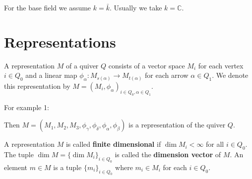 \documentclass[11pt, a4paper]{report}
\newcommand{\C}{\mathbb{C}}
\begin{document}
For the base field we assume $k=\bar{k}$. Usually we take $k=\C$.

\section{Representations}

\begin{definition}
    A representation $M$ of a quiver $Q$ consists of a vector space $M_i$ for each vertex $i \in Q_0$ and a linear map $\phi_{\alpha}: M_{s(\alpha)} \to M_{t(\alpha)}$ for each arrow $\alpha \in Q_1$. We denote this representation by $M=(M_i, \phi_{\alpha})_{i \in Q_0, \alpha \in Q_1}$.
\end{definition}

\begin{example}
    For example 1:
    \begin{center}
    \end{center}
    Then $M=(M_1, M_2, M_3, \phi_\gamma, \phi_\delta, \phi_\alpha, \phi_\beta)$ is a representation of the quiver $Q$.
\end{example}

\begin{definition}
    A representation $M$ is called \textbf{finite dimensional} if $\dim M_i < \infty$ for all $i \in Q_0$. The tuple $\dim M = \{\dim M_i\}_{i \in Q_0}$ is called the \textbf{dimension vector} of $M$. An element $m \in M$ is a tuple $\{m_i\}_{i \in Q_0}$ where $m_i \in M_i$ for each $i \in Q_0$.
\end{definition}
\end{document}
